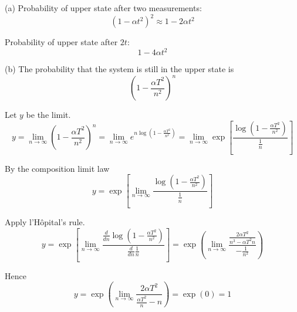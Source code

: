 (a) Probability of upper state after two measurements:
\begin{equation*}
(1-\alpha t^2)^2\approx1-2\alpha t^2
\end{equation*}

Probability of upper state after $2t$:
\begin{equation*}
1-4\alpha t^2
\end{equation*}

(b) The probability that the system is still in the upper state is
\begin{equation*}
\left(1-\frac{\alpha T^2}{n^2}\right)^n
\end{equation*}

Let $y$ be the limit.
\begin{equation*}
y=\lim_{n\rightarrow\infty}\left(1-\frac{\alpha T^2}{n^2}\right)^n
=\lim_{n\rightarrow\infty}e^{n\log\left(1-\frac{\alpha T^2}{n^2}\right)}
=\lim_{n\rightarrow\infty}\exp\left[\frac{\log\left(1-\frac{\alpha T^2}{n^2}\right)}{\frac{1}{n}}\right]
\end{equation*}

By the composition limit law
\begin{equation*}
y=\exp\left[
\lim_{n\rightarrow\infty}
\frac{\log\left(1-\frac{\alpha T^2}{n^2}\right)}
{\frac{1}{n}}
\right]
\end{equation*}

Apply l'H\^opital's rule.
\begin{equation*}
y=\exp\left[
\lim_{n\rightarrow\infty}
\frac{\frac{d}{dn}\log\left(1-\frac{\alpha T^2}{n^2}\right)}
{\frac{d}{dn}\frac{1}{n}}
\right]
=\exp\left(
\lim_{n\rightarrow\infty}
\frac
{\frac{2\alpha T^2}{n^3-\alpha T^2n}}
{-\frac{1}{n^2}}
\right)
\end{equation*}

Hence
\begin{equation*}
y=\exp\left(
\lim_{n\rightarrow\infty}
\frac{2\alpha T^2}{\frac{\alpha T^2}{n}-n}
\right)
=\exp(0)=1
\end{equation*}


